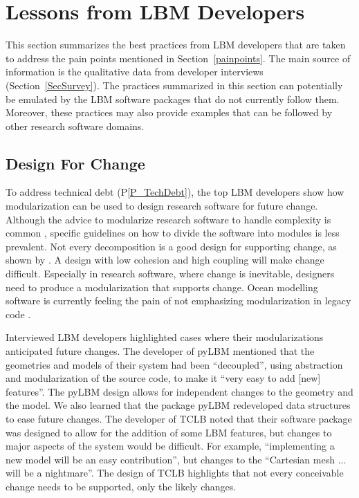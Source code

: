 \documentclass[final, 3p, times, authoryear]{elsarticle}
\newcommand{\ppref}[1]{P\ref{#1}}
\begin{document}
\section{Lessons from LBM Developers} \label{Sec_AddressConcerns}

This section summarizes the best practices from LBM developers that are taken to
address the pain points mentioned in Section~\ref{painpoints}.  The main source
of information is the qualitative data from developer interviews
(Section~\ref{SecSurvey}).  The practices summarized in this section can
potentially be emulated by the LBM software packages that do not currently
follow them.  Moreover, these practices may also provide examples that can be
followed by other research software domains.

\subsection{Design For Change} \label{Sec_DesForChange}

To address technical debt (\ppref{P_TechDebt}), the top LBM developers show how
modularization can be used to design research software for future change.
Although the advice to modularize research software to handle complexity is
common \citep{WilsonEtAl2014, StewartEtAl2017, Storer2017}, specific guidelines
on how to divide the software into modules is less prevalent.  Not every
decomposition is a good design for supporting change, as shown by
\citet{Parnas1972a}.  A design with low cohesion and high coupling \citep[p.\
48]{GhezziEtAl2003} will make change difficult. Especially in research software,
where change is inevitable, designers need to produce a modularization that
supports change. Ocean modelling software is currently feeling the pain of
not emphasizing modularization in legacy code \citep{JungEtAl2022}.

Interviewed LBM developers highlighted cases where their modularizations
anticipated future changes.  The developer of pyLBM mentioned that the
geometries and models of their system had been ``decoupled'', using abstraction
and modularization of the source code, to make it ``very easy to add [new]
features''.  The pyLBM design allows for independent changes to the geometry and
the model.  We also learned that the package pyLBM redeveloped data structures
to ease future changes. The developer of TCLB noted that their software package
was designed to allow for the addition of some LBM features, but changes to
major aspects of the system would be difficult. For example, ``implementing a
new model will be an easy contribution'', but changes to the ``Cartesian mesh
... will be a nightmare''.  The design of TCLB highlights that not every
conceivable change needs to be supported, only the likely changes.
\end{document}
